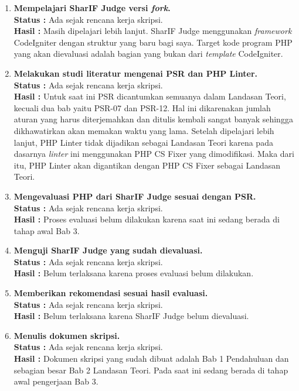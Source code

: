 \documentclass[a4paper,twoside]{article}
\begin{document}
	\begin{enumerate}
		\item \textbf{Mempelajari SharIF Judge versi \textit{fork}.}\\
		{\bf Status :} Ada sejak rencana kerja skripsi.\\
		{\bf Hasil :} Masih dipelajari lebih lanjut. SharIF Judge menggunakan \textit{framework} CodeIgniter dengan struktur yang baru bagi saya. Target kode program PHP yang akan dievaluasi adalah bagian yang bukan dari \textit{template} CodeIgniter.
		
		\item \textbf{Melakukan studi literatur mengenai PSR dan PHP Linter.}\\
		{\bf Status :} Ada sejak rencana kerja skripsi.\\
		{\bf Hasil :} Untuk saat ini PSR dicantumkan semuanya dalam Landasan Teori, kecuali dua bab yaitu PSR-07 dan PSR-12. Hal ini dikarenakan jumlah aturan yang harus diterjemahkan dan ditulis kembali sangat banyak sehingga dikhawatirkan akan memakan waktu yang lama. Setelah dipelajari lebih lanjut, PHP Linter tidak dijadikan sebagai Landasan Teori karena pada dasarnya \textit{linter} ini menggunakan PHP CS Fixer yang dimodifikasi. Maka dari itu, PHP Linter akan digantikan dengan PHP CS Fixer sebagai Landasan Teori. 

		\item \textbf{Mengevaluasi PHP dari SharIF Judge sesuai dengan PSR.}\\
		{\bf Status :} Ada sejak rencana kerja skripsi.\\
		{\bf Hasil :} Proses evaluasi belum dilakukan karena saat ini sedang berada di tahap awal Bab 3.

		\item \textbf{Menguji SharIF Judge yang sudah dievaluasi.}\\
		{\bf Status :} Ada sejak rencana kerja skripsi.\\
		{\bf Hasil :} Belum terlaksana karena proses evaluasi belum dilakukan.

		\item \textbf{Memberikan rekomendasi sesuai hasil evaluasi.}\\
		{\bf Status :} Ada sejak rencana kerja skripsi.\\
		{\bf Hasil :} Belum terlaksana karena SharIF Judge belum dievaluasi.

		\item \textbf{Menulis dokumen skripsi.}\\
		{\bf Status :} Ada sejak rencana kerja skripsi.\\
		{\bf Hasil :} Dokumen skripsi yang sudah dibuat adalah Bab 1 Pendahuluan dan sebagian besar Bab 2 Landasan Teori. Pada saat ini sedang berada di tahap awal pengerjaan Bab 3.

	\end{enumerate}
\end{document}
